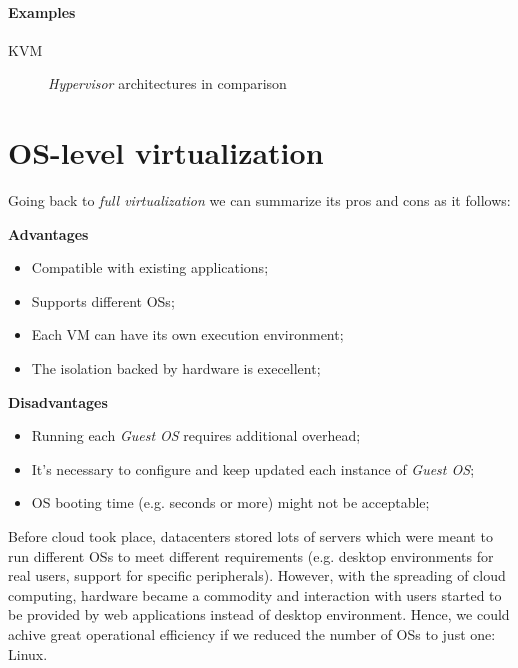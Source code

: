\paragraph{Examples} KVM

\begin{figure}[hb!]
    \centering
    \caption{\emph{Hypervisor} architectures in comparison}
\end{figure}

\section{OS-level virtualization}
Going back to \emph{full virtualization} we can summarize its pros and cons as
it follows:

\bigskip\noindent
\begin{minipage}[t]{0.48\textwidth}
    \textbf{Advantages}
    \begin{itemize}
        \item Compatible with existing applications;
        \item Supports different OSs;
        \item Each VM can have its own execution environment;
        \item The isolation backed by hardware is execellent;
    \end{itemize}
\end{minipage}
\hfill
\begin{minipage}[t]{0.48\textwidth}
    \textbf{Disadvantages}
    \begin{itemize}
        \item Running each \emph{Guest OS} requires additional overhead;
        \item It's necessary to configure and keep updated each instance of
        \emph{Guest OS};
        \item OS booting time (e.g. seconds or more) might not be acceptable;
    \end{itemize}
\end{minipage}

\bigskip\noindent
Before cloud took place, datacenters stored lots of servers which were meant to
run different OSs to meet different requirements (e.g. desktop environments for
real users, support for specific peripherals). However, with the spreading of
cloud computing, hardware became a commodity and interaction with users started
to be provided by web applications instead of desktop environment. Hence, we
could achive great operational efficiency if we reduced the number of OSs to
just one: Linux.

